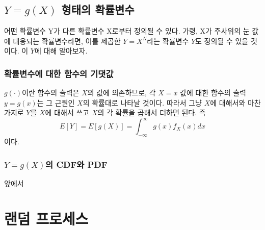 \subsection{$Y=g(X)$ 형태의 확률변수}
어떤 확률변수 Y가 다른 확률변수 X로부터 정의될 수 있다. 가령, X가 주사위의 눈 값에 대응되는 확률변수라면, 이를 제곱한 $Y=X^N$라는 확률변수 $Y$도 정의될 수 있을 것이다. 이 $Y$에 대해 알아보자.
\subsubsection{확률변수에 대한 함수의 기댓값}
$g(\cdot)$이란 함수의 출력은 $X$의 값에 의존하므로, 각 $X=x$ 값에 대한 함수의 출력 $y=g(x)$는 그 근원인 $X$의 확률대로 나타날 것이다.
따라서 그냥 $X$에 대해서와 마찬가지로 $Y$를 $X$에 대해서 쓰고 $X$의 각 확률을 곱해서 더하면 된다. 즉
\begin{equation}
    E[Y]=E[g(X)]=\int_{-\infty}^{\infty}g(x)f_X(x)dx
\end{equation}
이다.
\subsubsection{$Y=g(X)$의 CDF와 PDF}
앞에서  





\section{랜덤 프로세스}